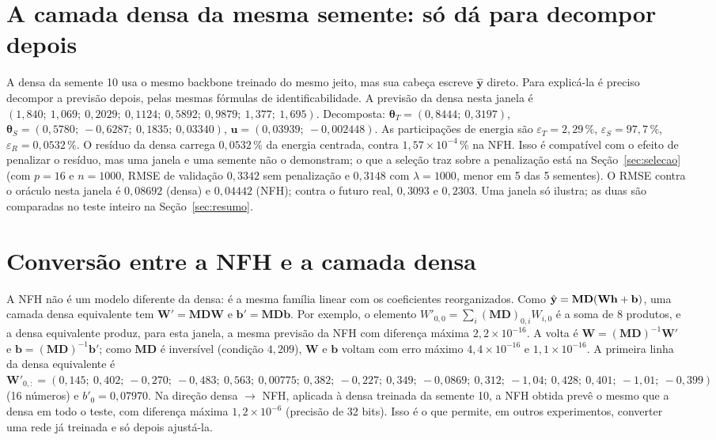 \documentclass[11pt,a4paper]{article}
\newcommand{\bh}{\mathbf{h}}\newcommand{\bW}{\mathbf{W}}\newcommand{\bb}{\mathbf{b}}\newcommand{\bc}{\mathbf{c}}
\newcommand{\bM}{\mathbf{M}}\newcommand{\bD}{\mathbf{D}}\newcommand{\bT}{\mathbf{T}}\newcommand{\bS}{\mathbf{S}}
\newcommand{\thT}{\boldsymbol{\theta}_T}\newcommand{\thS}{\boldsymbol{\theta}_S}\newcommand{\bu}{\mathbf{u}}
\begin{document}
\section{A camada densa da mesma semente: só dá para decompor depois}\label{sec:densa}

A densa da semente 10 usa o mesmo backbone treinado do mesmo jeito, mas sua cabeça escreve $\hat{\mathbf y}$ direto. Para explicá-la é preciso decompor a previsão depois, pelas mesmas fórmulas de identificabilidade. A previsão da densa nesta janela é $(1,840;\allowbreak\ 1,069;\allowbreak\ 0,2029;\allowbreak\ 0,1124;\allowbreak\ 0,5892;\allowbreak\ 0,9879;\allowbreak\ 1,377;\allowbreak\ 1,695)$. Decomposta: $\thT=(0,8444;\allowbreak\ 0,3197)$, $\thS=(0,5780;\allowbreak\ -0,6287;\allowbreak\ 0,1835;\allowbreak\ 0,03340)$, $\bu=(0,03939;\allowbreak\ -0,002448)$. As participações de energia são $\varepsilon_T=2,29\,\%$, $\varepsilon_S=97,7\,\%$, $\varepsilon_R=0,0532\,\%$. O resíduo da densa carrega $0,0532\,\%$ da energia centrada, contra $1,57\times 10^{-4}\,\%$ na NFH. Isso é compatível com o efeito de penalizar o resíduo, mas uma janela e uma semente não o demonstram; o que a seleção traz sobre a penalização está na Seção~\ref{sec:selecao} (com $p=16$ e $n=1000$, RMSE de validação $0,3342$ sem penalização e $0,3148$ com $\lambda=1000$, menor em 5 das 5 sementes). O RMSE contra o oráculo nesta janela é $0,08692$ (densa) e $0,04442$ (NFH); contra o futuro real, $0,3093$ e $0,2303$. Uma janela só ilustra; as duas são comparadas no teste inteiro na Seção~\ref{sec:resumo}.

\section{Conversão entre a NFH e a camada densa}\label{sec:conv}

A NFH não é um modelo diferente da densa: é a mesma família linear com os coeficientes reorganizados. Como $\byh=\bM\bD(\bW\bh+\bb)$, uma camada densa equivalente tem $\bW'=\bM\bD\bW$ e $\bb'=\bM\bD\bb$. Por exemplo, o elemento $W'_{0,0}=\sum_i(\bM\bD)_{0,i}W_{i,0}$ é a soma de 8 produtos, e a densa equivalente produz, para esta janela, a mesma previsão da NFH com diferença máxima $2,2\times 10^{-16}$. A volta é $\bW=(\bM\bD)^{-1}\bW'$ e $\bb=(\bM\bD)^{-1}\bb'$; como $\bM\bD$ é inversível (condição $4,209$), $\bW$ e $\bb$ voltam com erro máximo $4,4\times 10^{-16}$ e $1,1\times 10^{-16}$. A primeira linha da densa equivalente é $\bW'_{0,:}=(0,145;\allowbreak\ 0,402;\allowbreak\ -0,270;\allowbreak\ -0,483;\allowbreak\ 0,563;\allowbreak\ 0,00775;\allowbreak\ 0,382;\allowbreak\ -0,227;\allowbreak\ 0,349;\allowbreak\ -0,0869;\allowbreak\ 0,312;\allowbreak\ -1,04;\allowbreak\ 0,428;\allowbreak\ 0,401;\allowbreak\ -1,01;\allowbreak\ -0,399)$ (16 números) e $b'_0=0,07970$. Na direção densa $\to$ NFH, aplicada à densa treinada da semente 10, a NFH obtida prevê o mesmo que a densa em todo o teste, com diferença máxima $1,2\times 10^{-6}$ (precisão de 32 bits). Isso é o que permite, em outros experimentos, converter uma rede já treinada e só depois ajustá-la.
\end{document}

